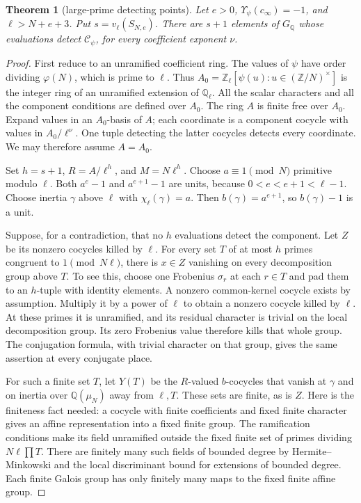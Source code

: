 \documentclass[11pt,a4paper]{article}
\newtheorem{theorem}{Theorem}[section]
\theoremstyle{definition}
\newcommand{\Q}{\mathbb Q}
\newcommand{\Z}{\mathbb Z}
\begin{document}
\begin{theorem}[large-prime detecting points]\label{thm:component-detectors}
Let \(e>0\), \(\Upsilon_\psi(c_\infty)=-1\),
and \(\ell>N+e+3\).
Put \(s=v_\ell(S_{N,e})\).
There are \(s+1\) elements of \(G_\Q\) whose evaluations detect
\(\mathcal C_\psi\), for every coefficient exponent \(\nu\).
\end{theorem}
\begin{proof}
First reduce to an unramified coefficient ring.
The values of \(\psi\) have order dividing \(\varphi(N)\),
which is prime to \(\ell\).
Thus
\(A_0=\Z_\ell[\psi(u):u\in(\Z/N)^\times]\)
is the integer ring of an unramified extension of \(\Q_\ell\).
All the scalar characters and all the component conditions
are defined over \(A_0\).
The ring \(A\) is finite free over \(A_0\).
Expand values in an \(A_0\)-basis of \(A\);
each coordinate is a component cocycle with values in
\(A_0/\ell^\nu\).
One tuple detecting the latter cocycles detects every coordinate.
We may therefore assume \(A=A_0\).

Set \(h=s+1\), \(R=A/\ell^h\), and \(M=N\ell^h\).
Choose \(a\equiv1\pmod N\) primitive modulo \(\ell\).
Both \(a^e-1\) and \(a^{e+1}-1\) are units, because
\(0<e<e+1<\ell-1\).
Choose inertia \(\gamma\) above \(\ell\) with
\(\chi_\ell(\gamma)=a\).
Then \(b(\gamma)=a^{e+1}\), so \(b(\gamma)-1\) is a unit.

Suppose, for a contradiction, that no \(h\) evaluations detect the component.
Let \(Z\) be its nonzero cocycles killed by \(\ell\).
For every set \(T\) of at most \(h\) primes
congruent to \(1\pmod{N\ell}\), there is \(x\in Z\)
vanishing on every decomposition group above \(T\).
To see this, choose one Frobenius \(\sigma_r\) at each \(r\in T\)
and pad them to an \(h\)-tuple with identity elements.
A nonzero common-kernel cocycle exists by assumption.
Multiply it by a power of \(\ell\) to obtain a nonzero cocycle killed
by \(\ell\).
At these primes it is unramified, and its residual character
is trivial on the local decomposition group.
Its zero Frobenius value therefore kills that whole group.
The conjugation formula, with trivial character on that group,
gives the same assertion at every conjugate place.

For such a finite set \(T\), let \(Y(T)\) be the \(R\)-valued
\(b\)-cocycles that vanish at \(\gamma\) and on inertia over
\(\Q(\mu_N)\) away from \(\ell,T\).
These sets are finite, as is \(Z\).
Here is the finiteness fact needed: a cocycle with finite coefficients
and fixed finite character gives an affine representation into
a fixed finite group. The ramification conditions make its field
unramified outside the fixed finite set of primes dividing \(N\ell\prod T\).
There are finitely many such fields of bounded degree by
Hermite--Minkowski and the local discriminant bound for extensions
of bounded degree. Each finite Galois group has only finitely many maps
to the fixed finite affine group.


\end{proof}
\end{document}
